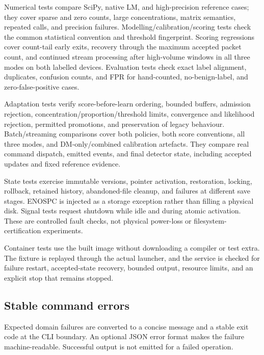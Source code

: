 Numerical tests compare SciPy, native LM, and high-precision reference cases;
they cover sparse and zero counts, large concentrations, matrix semantics,
repeated calls, and precision failures. Modelling/calibration/scoring tests
check the common statistical convention and threshold fingerprint.
Scoring regressions cover count-tail early exits, recovery through the maximum
accepted packet count, and continued stream processing after high-volume
windows in all three modes on both labelled devices.
Evaluation tests check exact label alignment, duplicates, confusion counts,
and FPR for hand-counted, no-benign-label, and zero-false-positive cases.

Adaptation tests verify score-before-learn ordering, bounded buffers, admission
rejection, concentration/proportion/threshold limits, convergence and
likelihood rejection, permitted promotions, and preservation of legacy
behaviour. Batch/streaming comparisons cover both policies, both score
conventions, all three modes, and DM-only/combined calibration artefacts.
They compare real command dispatch, emitted events, and final detector state,
including accepted updates and fixed reference evidence.

State tests exercise immutable versions, pointer activation, restoration,
locking, rollback, retained history, abandoned-file cleanup, and failures at
different save stages. ENOSPC is injected as a storage exception rather than
filling a physical disk. Signal tests request shutdown while idle and during
atomic activation. These are controlled fault checks, not physical power-loss
or filesystem-certification experiments.

Container tests use the built image without downloading a compiler or test
extra. The fixture is replayed through the actual launcher, and the service
is checked for failure restart, accepted-state recovery, bounded output,
resource limits, and an explicit stop that remains stopped.

\subsection{Stable command errors}

Expected domain failures are converted to a concise message and a stable exit
code at the CLI boundary. An optional JSON error format makes the failure
machine-readable. Successful output is not emitted for a failed operation.

